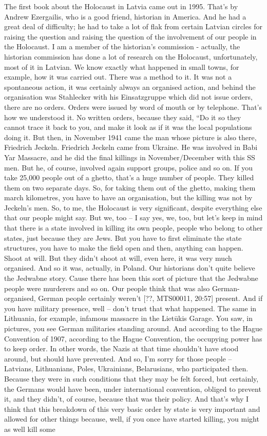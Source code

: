 The first book about the Holocaust in Latvia came out in 1995. That’s by Andrew Ezergailis, who is a good friend, historian in America. And he had a great deal of difficulty; he had to take a lot of flak from certain Latvian circles for raising the question and raising the question of the involvement of our people in the Holocaust. I am a member of the historian’s commission - actually, the historian commission has done a lot of research on the Holocaust, unfortunately, most of it in Latvian. We know exactly what happened in small towns, for example, how it was carried out. There was a method to it. It was not a spontaneous action, it was certainly always an organised action, and behind the organisation was Stahlecker with his Einsatzgruppe which did not issue orders, there are no orders. Orders were issued by word of mouth or by telephone. That’s how we understood it. No written orders, because they said, “Do it so they cannot trace it back to you, and make it look as if it was the local populations doing it. But then, in November 1941 came the man whose picture is also there, Friedrich Jeckeln. Friedrich Jeckeln came from Ukraine. He was involved in Babi Yar Massacre, and he did the final killings in November/December with this SS men. But he, of course, involved again support groups, police and so on. If you take 25,000 people out of a ghetto, that’s a huge number of people. They killed them on two separate days. So, for taking them out of the ghetto, making them march kilometres, you have to have an organisation, but the killing was not by Jeckeln’s men. So, to me, the Holocaust is very significant, despite everything else that our people might say. But we, too – I say yes, we, too, but let’s keep in mind that there is a state involved in killing its own people, people who belong to other states, just because they are Jews. But you have to first eliminate the state structures, you have to make the field open and then, anything can happen. Shoot at will. But they didn’t shoot at will, even here, it was very much organised. And so it was, actually, in Poland. Our historians don’t quite believe the Jedwabne story. Cause there has been this sort of picture that the Jedwabne people were murderers and so on. Our people think that was also German-organised, German people certainly weren’t [??, MTS00011, 20:57] present. And if you have military presence, well – don’t trust that what happened. The same in Lithuania, for example, infamous massacre in the Lietūkis Garage. You saw, in pictures, you see German militaries standing around. And according to the Hague Convention of 1907, according to the Hague Convention, the occupying power has to keep order. In other words, the Nazis at that time shouldn’t have stood around, but should have prevented. And so, I’m sorry for those people – Latvians, Lithuanians, Poles, Ukrainians, Belarusians, who participated then. Because they were in such conditions that they may be felt forced, but certainly, the Germans would have been, under international convention, obliged to prevent it, and they didn’t, of course, because that was their policy. And that’s why I think that this breakdown of this very basic order by state is very important and allowed for other things because, well, if you once have started killing, you might as well kill some 